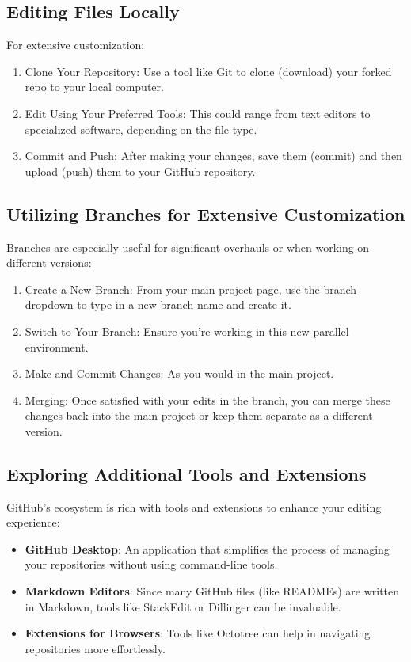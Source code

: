 \documentclass{book}
\begin{document}
\subsection*{Editing Files Locally}
For extensive customization:

\begin{enumerate}
    \item Clone Your Repository: Use a tool like Git to clone (download) your forked repo to your local computer.
    \item Edit Using Your Preferred Tools: This could range from text editors to specialized software, depending on the file type.
    \item Commit and Push: After making your changes, save them (commit) and then upload (push) them to your GitHub repository.
\end{enumerate}

\subsection*{Utilizing Branches for Extensive Customization}
Branches are especially useful for significant overhauls or when working on different versions:

\begin{enumerate}
    \item Create a New Branch: From your main project page, use the branch dropdown to type in a new branch name and create it.
    \item Switch to Your Branch: Ensure you're working in this new parallel environment.
    \item Make and Commit Changes: As you would in the main project.
    \item Merging: Once satisfied with your edits in the branch, you can merge these changes back into the main project or keep them separate as a different version.
\end{enumerate}

\subsection*{Exploring Additional Tools and Extensions}
GitHub's ecosystem is rich with tools and extensions to enhance your editing experience:

\begin{itemize}
    \item \textbf{GitHub Desktop}: An application that simplifies the process of managing your repositories without using command-line tools.
    \item \textbf{Markdown Editors}: Since many GitHub files (like READMEs) are written in Markdown, tools like StackEdit or Dillinger can be invaluable.
    \item \textbf{Extensions for Browsers}: Tools like Octotree can help in navigating repositories more effortlessly.
\end{itemize}
\end{document}
